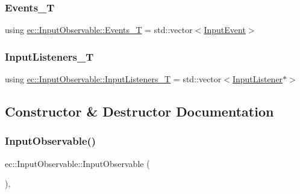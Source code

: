 \subsubsection{\texorpdfstring{Events\+\_\+T}{Events\_T}}
{\footnotesize\ttfamily using \mbox{\hyperlink{classec_1_1_input_observable_a9b63c8acbcbfc0f99d2964493ac52925}{ec\+::\+Input\+Observable\+::\+Events\+\_\+T}} =  std\+::vector$<$\mbox{\hyperlink{structec_1_1_input_event}{Input\+Event}}$>$}

\mbox{\label{classec_1_1_input_observable_a99717b2918621597db89d9ede34ddded}} 
\subsubsection{\texorpdfstring{Input\+Listeners\+\_\+T}{InputListeners\_T}}
{\footnotesize\ttfamily using \mbox{\hyperlink{classec_1_1_input_observable_a99717b2918621597db89d9ede34ddded}{ec\+::\+Input\+Observable\+::\+Input\+Listeners\+\_\+T}} =  std\+::vector$<$\mbox{\hyperlink{classec_1_1_input_listener}{Input\+Listener}}$\ast$$>$}



\subsection{Constructor \& Destructor Documentation}
\mbox{\label{classec_1_1_input_observable_a92422814189d1210f631f4d1378877f3}} 
\subsubsection{\texorpdfstring{Input\+Observable()}{InputObservable()}}
{\footnotesize\ttfamily ec\+::\+Input\+Observable\+::\+Input\+Observable (\begin{DoxyParamCaption}{ }\end{DoxyParamCaption})\hspace{0.3cm}{\ttfamily [explicit]}, {\ttfamily [default]}}

